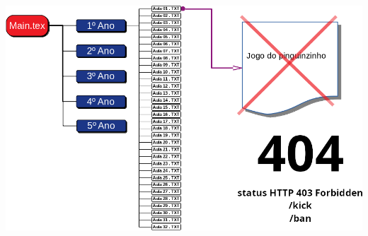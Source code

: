 		\begin{center}
			\includegraphics[height=.\textheight]{./IMG-GIT/SVG/DIAGRAMAS9.png}
		\end{center}
		
		\null
		\pagebreak
